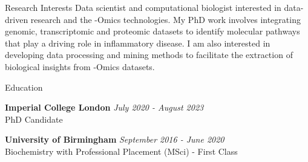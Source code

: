 \documentclass{resume}
\begin{document}
\begin{rSection}{Research Interests}
\vspace{1pt plus 1pt}
Data scientist and computational biologist interested in data-driven research and the -Omics technologies. My PhD work involves integrating genomic, transcriptomic and proteomic datasets to identify molecular pathways that play a driving role in inflammatory disease. I am also interested in developing data processing and mining methods to facilitate the extraction of biological insights from -Omics datasets.

\end{rSection}
\begin{rSection}{Education}

\vspace{1pt plus 1pt}
{\bf Imperial College London} \hfill {\em July 2020 - August 2023} 
\\ PhD Candidate

\smallskip

{\bf University of Birmingham} \hfill {\em September 2016 - June 2020} 
\\ Biochemistry with Professional Placement (MSci) - First Class
\end{rSection}

\end{document}
